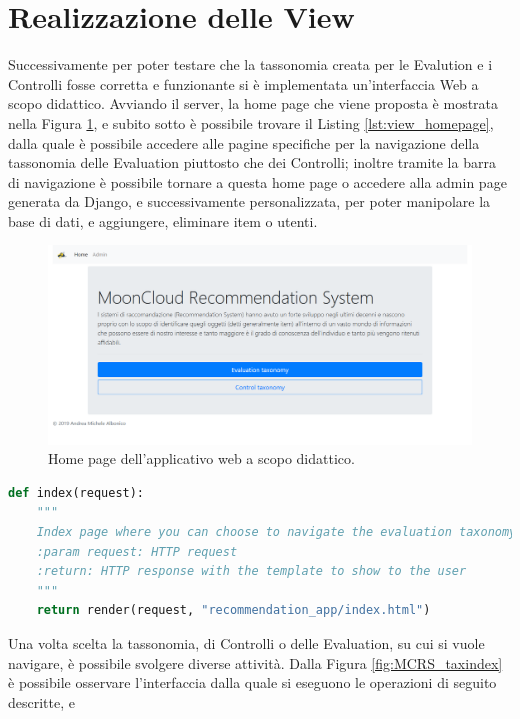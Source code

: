 \section*{Realizzazione delle View}
Successivamente per poter testare che la tassonomia creata per le Evalution e i Controlli fosse corretta e funzionante si è 
implementata un'interfaccia Web a scopo didattico.
Avviando il server, la home page che viene proposta è mostrata nella Figura \ref{fig:MCRS_homepage}, e subito 
sotto è possibile trovare il Listing \ref{lst:view_homepage}, dalla quale è possibile 
accedere alle pagine specifiche per la navigazione della tassonomia delle Evaluation piuttosto che dei Controlli; inoltre 
tramite la barra di navigazione è possibile tornare a questa home page o accedere alla admin page generata da Django, e 
successivamente personalizzata, per poter manipolare la base di dati, e aggiungere, eliminare item o utenti.
%
\begin{figure}[ht!]
    \includegraphics[scale=0.3]{images/MCRS_homepage.png}
    \caption{Home page dell'applicativo web a scopo didattico.}
    \label{fig:MCRS_homepage}
\end{figure}
\lstset{style=python_code_style}
\begin{lstlisting}[language=Python, label=lst:view_homepage, caption={Parte principale del codice delle View della soluzione per gestire l'accesso 
    alla home page.}]
def index(request):
    """
    Index page where you can choose to navigate the evaluation taxonomy or the control taxonomy.
    :param request: HTTP request
    :return: HTTP response with the template to show to the user
    """
    return render(request, "recommendation_app/index.html")
\end{lstlisting}
%
Una volta scelta la tassonomia, di Controlli o delle Evaluation, su cui si vuole navigare, è possibile svolgere diverse attività. 
Dalla Figura \ref{fig:MCRS_taxindex} è possibile osservare l'interfaccia dalla quale si eseguono le operazioni di seguito descritte, e
